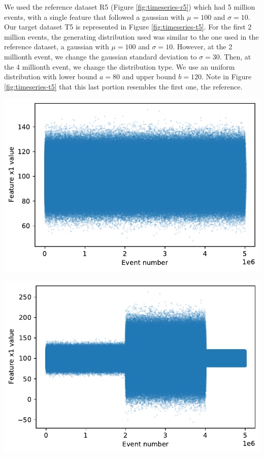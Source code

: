 We used the reference dataset R5 (Figure \ref{fig:timeseries-r5}) which had 5 million events, with a single feature that followed a gaussian with  $\mu=100$ and $\sigma=10$. Our target dataset T5 is represented in Figure \ref{fig:timeseries-t5}. For the first 2 million events, the generating distribution used was similar to the one used in the reference dataset, a gaussian with $\mu=100$ and $\sigma=10$. However, at the 2 millionth event, we change the gaussian standard deviation to $\sigma=30$. Then, at the 4 millionth event, we change the distribution type. We use an uniform distribution with lower bound $a=80$ and upper bound $b=120$. Note in Figure \ref{fig:timeseries-t5} that this last portion resembles the first one, the reference.
\begin{center}
\begin{minipage}{.5\textwidth}
  \centering
  \includegraphics[width=1\linewidth]{figures/timeseries-r5.pdf}
  \label{fig:timeseries-r5}
\end{minipage}%
\begin{minipage}{.5\textwidth}
  \centering
  \includegraphics[width=1\linewidth]{figures/timeseries-t5.pdf}
  \label{fig:timeseries-t5}
\end{minipage}
\end{center}


